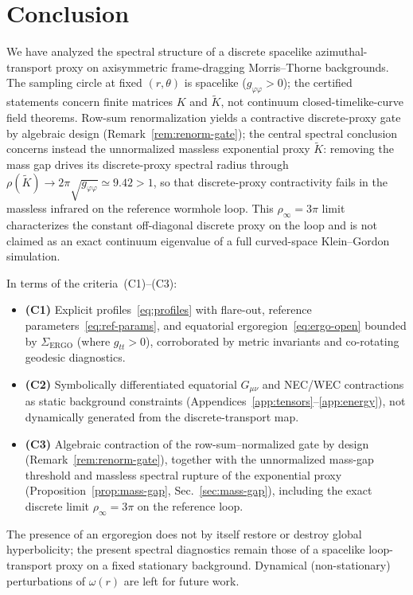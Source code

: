 \documentclass{iopjournal}
\newcommand{\omegar}{\omega(r)}
\newcommand{\Gmn}{G_{\mu\nu}}
\theoremstyle{remark}
\begin{document}
\section{Conclusion}
\label{sec:conclusion}

We have analyzed the spectral structure of a discrete spacelike azimuthal-transport proxy on axisymmetric frame-dragging Morris--Thorne backgrounds.
The sampling circle at fixed $(r,\theta)$ is spacelike ($g_{\varphi\varphi}>0$); the certified statements concern finite matrices $K$ and $\widetilde{K}$, not continuum closed-timelike-curve field theorems.
Row-sum renormalization yields a contractive discrete-proxy gate by algebraic design (Remark~\ref{rem:renorm-gate}); the central spectral conclusion concerns instead the unnormalized massless exponential proxy $\widetilde{K}$: removing the mass gap drives its discrete-proxy spectral radius through
$\rho(\widetilde{K})\to 2\pi\sqrt{g_{\varphi\varphi}}\simeq 9.42>1$,
so that discrete-proxy contractivity fails in the massless infrared on the reference wormhole loop.
This $\rho_{\infty}=3\pi$ limit characterizes the constant off-diagonal discrete proxy on the loop and is not claimed as an exact continuum eigenvalue of a full curved-space Klein--Gordon simulation.

In terms of the criteria~(C1)--(C3):
\begin{itemize}
  \item \textbf{(C1)} Explicit profiles~\eqref{eq:profiles} with flare-out, reference parameters~\eqref{eq:ref-params}, and equatorial ergoregion~\eqref{eq:ergo-open} bounded by $\Sigma_{\mathrm{ERGO}}$ (where $g_{tt}>0$), corroborated by metric invariants and co-rotating geodesic diagnostics.
  \item \textbf{(C2)} Symbolically differentiated equatorial $\Gmn$ and NEC/WEC contractions as static background constraints (Appendices~\ref{app:tensors}--\ref{app:energy}), not dynamically generated from the discrete-transport map.
  \item \textbf{(C3)} Algebraic contraction of the row-sum--normalized gate by design (Remark~\ref{rem:renorm-gate}), together with the unnormalized mass-gap threshold and massless spectral rupture of the exponential proxy (Proposition~\ref{prop:mass-gap}, Sec.~\ref{sec:mass-gap}), including the exact discrete limit $\rho_{\infty}=3\pi$ on the reference loop.
\end{itemize}

The presence of an ergoregion does not by itself restore or destroy global hyperbolicity; the present spectral diagnostics remain those of a spacelike loop-transport proxy on a fixed stationary background.
Dynamical (non-stationary) perturbations of $\omegar$ are left for future work.
\end{document}
